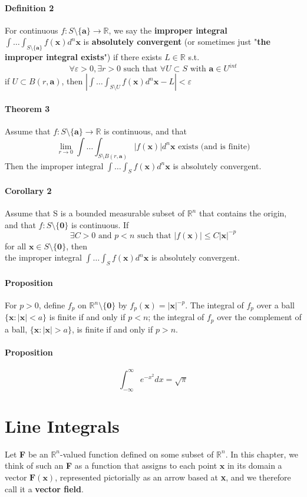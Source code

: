 \documentclass[11pt]{article}
\newcommand{\tb}[1]{\textbf{#1}}
\newcommand{\real}[0]{\mathbb{R}}
\newcommand{\vx}[0]{\tb{x}}
\newcommand{\vo}[0]{\tb{0}}
\newcommand{\va}[0]{\tb{a}}
\begin{document}
\paragraph{Definition 2} For continuous $f: S \setminus \{\tb{a}\} \rightarrow \real$, we say the \tb{improper integral} $\int \hdots \int_{S\setminus\{\va\}} f(\vx)d^n\vx$ is \tb{absolutely convergent} (or sometimes just "\tb{the improper integral exists}") if there exists $L \in \real$ s.t.
$$\forall \varepsilon >0, \exists r > 0 \mbox{ such that } \forall U \subset S \mbox{ with } \tb{a} \in U^{int}$$
if $ U \subset B(r, \tb{a})$, then $|\int \hdots \int_{S\setminus U} f(\vx) d^n\vx - L| < \varepsilon$

\paragraph{Theorem 3} Assume that $f: S\setminus\{\tb{a}\} \rightarrow \real$ is continuous, and that
$$\underset{r \rightarrow 0}{\lim} \int \hdots \int_{S\setminus B(r, \tb{a})} |f(\vx)|d^n\vx \mbox{ exists (and is finite)}$$
Then the improper integral $\int \hdots \int_{S}f(\vx)d^n\vx$ is absolutely convergent.
\paragraph{Corollary 2} Assume that S is a bounded measurable subset of $\real^n$ that contains the origin, and that $f: S \setminus \{\vo\}$ is continuous. If 
$$\exists C > 0 \mbox{ and } p < n \mbox{ such that } |f(\vx)|\leq C|\vx|^{-p}$$
for all $\vx \in S \setminus \{\vo\}$, then\\
the improper integral $\int \hdots \int_S f(\vx)d^n\vx$ is absolutely convergent.


\paragraph{Proposition} For $p > 0$, define $f_p$ on $\real^n \setminus \{\vo\}$ by $f_p(\vx) = |\vx|^{-p}$. The integral of $f_p$ over a ball $\{\vx:|\vx| < a\}$ is finite if and only if $p<n$; the integral of $f_p$ over the complement of a ball, $\{\vx:|\vx| > a\}$, is finite if and only if $p>n$.

\paragraph{Proposition} $$\int_{-\infty}^\infty e^{-x^2}dx = \sqrt{\pi}$$
\section{Line Integrals}
Let \tb{F} be an $\real^n$-valued function defined on some subset of $\real^n$. In this chapter, we think of such an \tb{F} as a function that assigns to each point $\vx$ in its domain a vector $\tb{F}(\vx)$, represented pictorially as an arrow based at \vx, and we therefore call it a \tb{vector field}.
\end{document}
